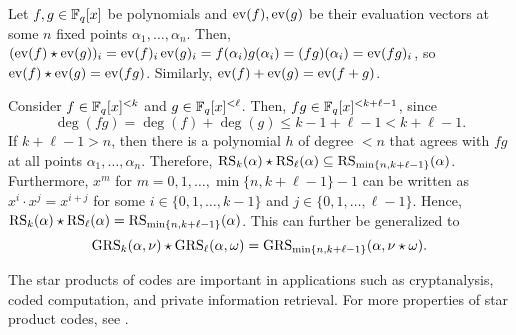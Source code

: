 \documentclass[../main.tex]{subfiles}
\begin{document}
Let $f, g \in \mathbb{F}_q[x]$ be polynomials and $\operatorname{ev}(f), \operatorname{ev}(g)$ be their evaluation vectors at some $n$ fixed points $\alpha_1, \dots, \alpha_n$. Then, $(\operatorname{ev}(f) \star \operatorname{ev}(g))_i = \operatorname{ev}(f)_i \operatorname{ev}(g)_i = f(\alpha_i)g(\alpha_i) = (fg)(\alpha_i) = \operatorname{ev}(fg)_i$, so $\operatorname{ev}(f) \star \operatorname{ev}(g) = \operatorname{ev}(fg)$. Similarly, $\operatorname{ev}(f) + \operatorname{ev}(g) = \operatorname{ev}(f + g)$.

Consider $f \in \mathbb{F}_q[x]^{< k}$ and $g \in \mathbb{F}_q[x]^{< \ell}$. Then, $fg \in \mathbb{F}_q[x]^{< k + \ell - 1}$, since
\begin{equation*}
    \deg(fg) = \deg(f) + \deg(g) \leq k - 1 + \ell - 1 < k + \ell - 1.
\end{equation*}
If $k + \ell - 1 > n$, then there is a polynomial $h$ of degree $< n$ that agrees with $fg$ at all points $\alpha_1, \dots, \alpha_n$. Therefore, $\operatorname{RS}_k(\alpha) \star \operatorname{RS}_\ell(\alpha) \subseteq \operatorname{RS}_{\min\{n, k + \ell - 1\}}(\alpha)$. Furthermore, $x^m$ for $m = 0, 1, \dots, \min\{n, k + \ell - 1\} - 1$ can be written as $x^i \cdot x^j = x^{i + j}$ for some $i \in \{0, 1, \dots, k - 1\}$ and $j \in \{0, 1, \dots, \ell - 1\}$. Hence, $\operatorname{RS}_k(\alpha) \star \operatorname{RS}_\ell(\alpha) = \operatorname{RS}_{\min\{n, k + \ell - 1\}}(\alpha)$. This can further be generalized to
\begin{equation*}
    \operatorname{GRS}_k(\alpha, \nu) \star \operatorname{GRS}_\ell(\alpha, \omega) = \operatorname{GRS}_{\min\{n, k + \ell - 1\}}(\alpha, \nu \star \omega).
\end{equation*}

The star products of codes are important in applications such as cryptanalysis, coded computation, and private information retrieval. For more properties of star product codes, see \cite{randriambololona2015products}.


\end{document}
